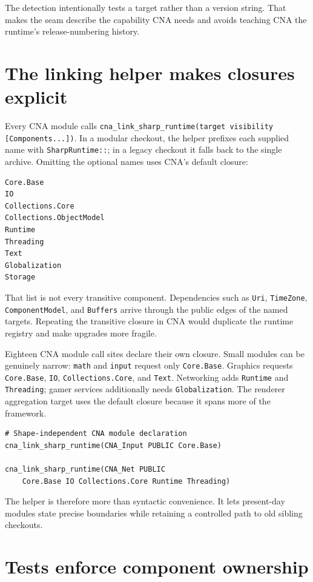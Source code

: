 The detection intentionally tests a target rather than a version string. That makes the seam
describe the capability CNA needs and avoids teaching CNA the runtime's release-numbering
history.

\section{The linking helper makes closures explicit}

Every CNA module calls
\texttt{cna\_link\_sharp\_runtime(target visibility [Components...])}. In a modular checkout,
the helper prefixes each supplied name with \texttt{SharpRuntime::}; in a legacy checkout it
falls back to the single archive. Omitting the optional names uses CNA's default closure:

\begin{lstlisting}
Core.Base
IO
Collections.Core
Collections.ObjectModel
Runtime
Threading
Text
Globalization
Storage
\end{lstlisting}

That list is not every transitive component. Dependencies such as \texttt{Uri},
\texttt{TimeZone}, \texttt{ComponentModel}, and \texttt{Buffers} arrive through the public
edges of the named targets. Repeating the transitive closure in CNA would duplicate the
runtime registry and make upgrades more fragile.

Eighteen CNA module call sites declare their own closure. Small modules can be genuinely
narrow: \texttt{math} and \texttt{input} request only \texttt{Core.Base}. Graphics requests
\texttt{Core.Base}, \texttt{IO}, \texttt{Collections.Core}, and \texttt{Text}. Networking
adds \texttt{Runtime} and \texttt{Threading}; gamer services additionally needs
\texttt{Globalization}. The renderer aggregation target uses the default closure because it
spans more of the framework.

\begin{lstlisting}
# Shape-independent CNA module declaration
cna_link_sharp_runtime(CNA_Input PUBLIC Core.Base)

cna_link_sharp_runtime(CNA_Net PUBLIC
    Core.Base IO Collections.Core Runtime Threading)
\end{lstlisting}

The helper is therefore more than syntactic convenience. It lets present-day modules state
precise boundaries while retaining a controlled path to old sibling checkouts.

\section{Tests enforce component ownership}

